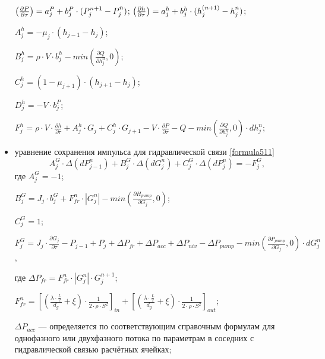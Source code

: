 \begin{itemize}[topsep=5pt, itemsep=-3pt]
\noindent \hspace{0.6cm} $\left(\frac{\partial P}{\partial\tau} \right)=a_j^P+b_j^P\cdot (P_j^{n+1}-P_j^{n \mathstrut})$; $\left(\frac{\partial h}{\partial\tau} \right)=a_j^h+b_j^h\cdot (h_j^{(n+1)}-h_j^{n \mathstrut})$;

\noindent \hspace{0.6cm} $A_j^h=-\mu_j\cdot (h_{j-1}-h_j)$;

\noindent \hspace{0.6cm} $B_j^h=\rho\cdot V\cdot b_j^h - min\left(\frac{\partial Q}{\partial h_j^n},0 \right)$;

\noindent \hspace{0.6cm} $C_j^h=(1-\mu_{j+1})\cdot (h_{j+1}-h_j)$;

\noindent \hspace{0.6cm} $D_j^h=-V \cdot b_j^P$;

\noindent \hspace{0.6cm} $F_j^h=\rho\cdot V\cdot\frac{\partial h}{\partial\tau}+A_j^h\cdot G_j + C_j^h\cdot G_{j+1}-V\cdot\frac{\partial P}{\partial\tau}-Q-min\left(\frac{\partial Q}{\partial h_j^n},0 \right)\cdot dh_j^n$;

\item уравнение сохранения импульса для гидравлической связи \eqref{formula511}
$$
A_j^G \cdot \Delta(dP_{j-1}^n)+B_j^G \cdot \Delta(dG_j^n) + C_j^G \cdot \Delta(dP_j^n) = -F_j^G, 
$$
где $A_j^G=-1$; 

\noindent \hspace{0.6cm} $B_j^G = J_j \cdot b_j^G + F_{fr}^n\cdot | G_j^n | - min\left(\frac{\partial H_{pump}}{\partial G_j},0\right)$;

\noindent \hspace{0.6cm} $C_j^G=1$;

\noindent \hspace{0.6cm} $F_j^G=J_j \cdot \frac{\partial G_j}{\partial\tau} - P_{j-1} + P_j + \Delta P_{fr} + \Delta P_{acc} + \Delta P_{niv} - \Delta P_{pump} - min\left(\frac{\partial P_{pump}}{\partial G_j},0\right)\cdot dG_j^n$,

\noindent где $\Delta P_{fr}=F_{fr}^n\cdot | G_j^n | \cdot G_j^{n+1}$;

\noindent \hspace{0.6cm} $F_{fr}^n=\left[\left(\frac{\lambda\cdot\frac L 2}{d_g} + \xi \right)\cdot \frac{1}{2\cdot\rho\cdot S^2} \right]_{in} + \left[\left(\frac{\lambda\cdot\frac L 2}{d_g} + \xi \right)\cdot \frac{1}{2\cdot\rho\cdot S^2} \right]_{out}$;

\noindent \hspace{0.6cm} $\Delta P_{acc}$ --- определяется по соответствующим справочным формулам для однофазного или двухфазного потока по параметрам в соседних с гидравлической связью расчётных ячейках;


\end{itemize}
